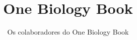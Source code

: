 \documentclass[11pt,a4paper,twoside,openany]{book}
\title{One Biology Book}
\author{Os colaboradores do One Biology Book}
\date{\bookdate}
\begin{document}
\frontmatter




\tableofcontents

\mainmatter



\appendix
\part{\omsolutionspart}


\backmatter
\printindex
\end{document}

